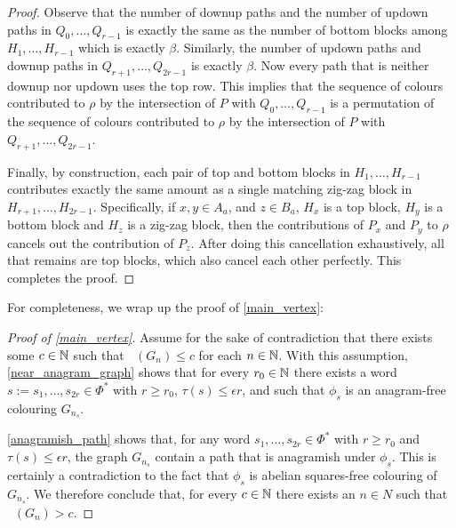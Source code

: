 \documentclass{patmorin}
\DeclareMathOperator{\afcn}{\dot{\chi}_\pi}
\begin{document}
\begin{proof}
    Observe that the number of downup paths and the number of updown paths in $Q_0,\ldots,Q_{r-1}$ is exactly the same as the number of bottom blocks among $H_1,\ldots,H_{r-1}$ which is exactly $\beta$.  Similarly, the number of updown paths and downup paths in $Q_{r+1},\ldots,Q_{2r-1}$ is exactly $\beta$.  Now every path that is neither downup nor updown uses the top row.  This implies that the sequence of colours contributed to $\rho$ by  the intersection of $P$ with $Q_0,\ldots,Q_{r-1}$ is a permutation of the sequence of colours contributed to $\rho$ by the intersection of $P$ with $Q_{r+1},\ldots,Q_{2r-1}$.

    Finally, by construction, each pair of top and bottom blocks in $H_1,\ldots,H_{r-1}$ contributes exactly the same amount as a single matching zig-zag block in $H_{r+1},\ldots,H_{2r-1}$.  Specifically, if $x,y\in A_a$, and $z\in B_a$, $H_x$ is a top block, $H_y$ is a bottom block and $H_z$ is a zig-zag block, then the contributions of $P_x$ and $P_y$ to $\rho$ cancels out the contribution of $P_z$. After doing this cancellation exhaustively, all that remains are top blocks, which also cancel each other perfectly.  This completes the proof.
\end{proof}


For completeness, we wrap up the proof of \cref{main_vertex}:

\begin{proof}[Proof of \cref{main_vertex}]
    Assume for the sake of contradiction that there exists some $c\in\mathbb{N}$ such that $\afcn(G_n)\le c$ for each $n\in\mathbb{N}$.  With this assumption, \cref{near_anagram_graph} shows that for every $r_0\in\mathbb{N}$ there exists a word $s:=s_1,\ldots,s_{2r}\in\Phi^*$ with $r\ge r_0$, $\tau(s)\le\epsilon r$, and such that $\phi_s$ is an anagram-free colouring $G_{n_s}$.

    \cref{anagramish_path} shows that, for any word $s_1,\ldots,s_{2r}\in\Phi^*$ with $r\ge r_0$ and $\tau(s)\le\epsilon r$, the graph $G_{n_s}$ contain a path that is anagramish under $\phi_s$.  This is certainly a contradiction to the fact that $\phi_s$ is abelian squares-free colouring of $G_{n_s}$. We therefore conclude that, for every $c\in\mathbb{N}$ there exists an $n\in N$ such that $\afcn(G_n)> c$.
\end{proof}

%
\end{document}
